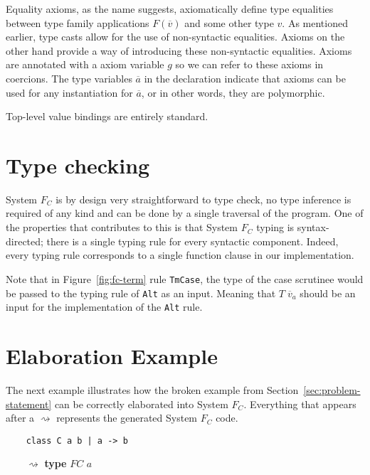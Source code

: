 Equality axioms, as the name suggests, axiomatically define type equalities
between type family applications $F(\overline{v})$ and some other type $v$. As
mentioned earlier, type casts allow for the use of non-syntactic equalities.
Axioms on the other hand provide a way of introducing these non-syntactic
equalities. Axioms are annotated with a axiom variable $g$ so we can refer to
these axioms in coercions. The type variables $\overline{a}$ in the declaration
indicate that axioms can be used for any instantiation for $\overline{a}$, or in
other words, they are polymorphic.

Top-level value bindings are entirely standard.


\section{Type checking}

System $F_C$ is by design very straightforward to type check, no type inference
is required of any kind and can be done by a single traversal of the program.
One of the properties that contributes to this is that System $F_C$ typing is
syntax-directed; there is a single typing rule for every syntactic component.
Indeed, every typing rule corresponds to a single function clause in our
implementation.

Note that in Figure~\ref{fig:fc-term} rule \texttt{TmCase}, the type of the case
scrutinee would be passed to the typing rule of \texttt{Alt} as an input.
Meaning that $T \; \overline{v}_a$ should be an input for the implementation of
the \texttt{Alt} rule.

\section{Elaboration Example}

The next example illustrates how the broken example from
Section~\ref{sec:problem-statement} can be correctly elaborated into System
$F_C$. Everything that appears after a $\rightsquigarrow$ represents the
generated System $F_C$ code.

\begin{verbatim}
    class C a b | a -> b
\end{verbatim}

$\qquad\rightsquigarrow$ \textbf{type} $FC$ $a$

